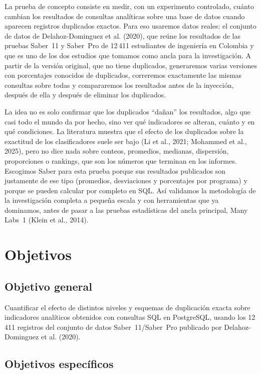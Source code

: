 \documentclass[11pt,openany,oneside,letterpaper]{book}
\begin{document}
La prueba de concepto consiste en medir, con un experimento controlado, cuánto cambian los resultados de consultas analíticas sobre una base de datos cuando aparecen registros duplicados exactos. Para eso usaremos datos reales: el conjunto de datos de Delahoz-Dominguez et al. (2020), que reúne los resultados de las pruebas Saber~11 y Saber~Pro de 12\,411 estudiantes de ingeniería en Colombia y que es uno de los dos estudios que tomamos como ancla para la investigación. A partir de la versión original, que no tiene duplicados, generaremos varias versiones con porcentajes conocidos de duplicados, correremos exactamente las mismas consultas sobre todas y compararemos los resultados antes de la inyección, después de ella y después de eliminar los duplicados.

La idea no es solo confirmar que los duplicados ``dañan'' los resultados, algo que casi todo el mundo da por hecho, sino ver qué indicadores se alteran, cuánto y en qué condiciones. La literatura muestra que el efecto de los duplicados sobre la exactitud de los clasificadores suele ser bajo (Li et al., 2021; Mohammed et al., 2025), pero no dice nada sobre conteos, promedios, medianas, dispersión, proporciones o rankings, que son los números que terminan en los informes. Escogimos Saber para esta prueba porque sus resultados publicados son justamente de ese tipo (promedios, desviaciones y porcentajes por programa) y porque se pueden calcular por completo en SQL. Así validamos la metodología de la investigación completa a pequeña escala y con herramientas que ya dominamos, antes de pasar a las pruebas estadísticas del ancla principal, Many Labs~1 (Klein et al., 2014).

\section{Objetivos}

\subsection{Objetivo general}

Cuantificar el efecto de distintos niveles y esquemas de duplicación exacta sobre indicadores analíticos obtenidos con consultas SQL en PostgreSQL, usando los 12\,411 registros del conjunto de datos Saber~11/Saber~Pro publicado por Delahoz-Dominguez et al. (2020).

\subsection{Objetivos específicos}
\end{document}
